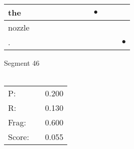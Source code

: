 \documentclass[landscape]{article}
\newcommand{\ssp}{\hspace{2pt}}
\newcommand{\mex}{\cellcolor{g}$\bullet$}
\begin{document}
\begin{tabular}{|l|p{10pt}|p{10pt}|p{10pt}|p{10pt}|p{10pt}|p{10pt}|p{10pt}|p{10pt}|p{10pt}|p{10pt}|p{10pt}|}
\hline
\ssp \cellcolor{ref7}the \ssp&\hspace{2pt}&\hspace{2pt}&\hspace{2pt}&\hspace{2pt}&\hspace{2pt}&\hspace{2pt}&\hspace{2pt}&\hspace{2pt}\mex&\hspace{2pt}&\hspace{2pt}&\hspace{2pt}\\
\hline
\ssp nozzle \ssp&\hspace{2pt}&\hspace{2pt}&\hspace{2pt}&\hspace{2pt}&\hspace{2pt}&\hspace{2pt}&\hspace{2pt}&\hspace{2pt}&\hspace{2pt}&\hspace{2pt}&\hspace{2pt}\\
\hline
\ssp \cellcolor{ref10}. \ssp&\hspace{2pt}&\hspace{2pt}&\hspace{2pt}&\hspace{2pt}&\hspace{2pt}&\hspace{2pt}&\hspace{2pt}&\hspace{2pt}&\hspace{2pt}&\hspace{2pt}&\hspace{2pt}\mex\\
\hline
\end{tabular}

\vspace{6pt}
\noindent Segment 46\\\\
\noindent\begin{tabular}{lm{12pt}r}
\hline
P:&&0.200\\
R:&&0.130\\
Frag:&&0.600\\
Score:&&0.055\\
\end{tabular}
\end{document}
